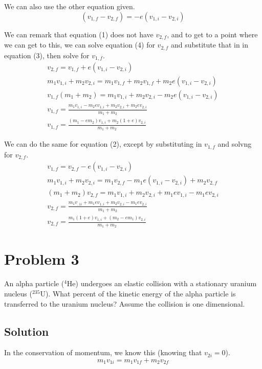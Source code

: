 \documentclass[12pt]{article}
\begin{document}
We can also use the other equation given.
\begin{equation}
    (v_{1,f} - v_{2,f}) = -e(v_{1,i} - v_{2,i})
\end{equation}

We can remark that equation (1) does not have $v_{2,f}$, and to get to a point where we can get to this, we can solve equation (4) for $v_{2,f}$ and substitute that in in equation (3), then solve for $v_{1,f}$.
\begin{gather}
    v_{2,f} = v_{1,f} + e(v_{1,i} - v_{2,i})\\
    m_1v_{1,i} + m_2v_{2,i} = m_1v_{1,f} + m_2v_{1,f} + m_2e(v_{1,i} - v_{2,i})\\
    v_{1,f}(m_1 + m_2) = m_1v_{1,i} + m_2v_{2,i} - m_2e(v_{1,i} - v_{2,i})\\
    v_{1,f} = \frac{m_1v_{1,i} - m_2ev_{1,i} + m_2v_{2,i} + m_2ev_{2,i}}{m_1 + m_2}\\
    v_{1,f} = \frac{(m_1 - em_2)v_{1,i} + m_2(1+e)v_{2,i}}{m_1 + m_2}
\end{gather}

We can do the same for equation (2), except by substituting in $v_{1,f}$ and solvng for $v_{2,f}$.
\begin{gather}
    v_{1,f} = v_{2,f} - e(v_{1,i} - v_{2,i})\\
    m_1v_{1,i} + m_2v_{2,i} = m_1v_{2,f} - m_1e(v_{1,i} - v_{2,i}) + m_2v_{2,f}\\
    (m_1 + m_2)v_{2,f} = m_1v_{1,i} + m_2v_{2,i} + m_1ev_{1,i} - m_1ev_{2,i}\\
    v_{2,f} = \frac{m_1v_{,1i} + m_1ev_{1,i} + m_2v_{2,i} - m_1ev_{2,i}}{m_1 + m_2}\\
    v_{2,f} = \frac{m_1(1 + e)v_{1,i} + (m_2 - em_1)v_{2,i}}{m_1 + m_2}
\end{gather}


\pagebreak
\setcounter{equation}{0}
\section*{Problem 3}
An alpha particle ($^4$He) undergoes an elastic collision with a stationary uranium nucleus ($^{235}$U). What percent of the kinetic energy of the alpha particle is transferred to the uranium nucleus? Assume the collision is one dimensional.

\subsection*{Solution}
In the conservation of momentum, we know this (knowing that $v_{2i} = 0$).
\begin{equation}
    m_1v_{1i} = m_1v_{1f} + m_2v_{2f}
\end{equation}
\end{document}
